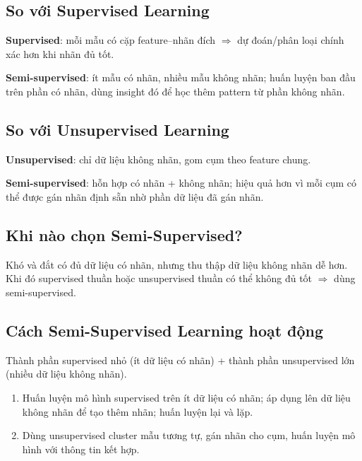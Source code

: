 \subsection{So với Supervised Learning}

\begin{ynghia}[title={Khác biệt chính: dataset}]
\textbf{Supervised}: mỗi mẫu có cặp feature--nhãn đích $\Rightarrow$ dự đoán/phân loại chính xác hơn khi nhãn đủ tốt.

\textbf{Semi-supervised}: ít mẫu có nhãn, nhiều mẫu không nhãn; huấn luyện ban đầu trên phần có nhãn, dùng insight đó để học thêm pattern từ phần không nhãn.
\end{ynghia}

\subsection{So với Unsupervised Learning}

\begin{ynghia}[title={Khác biệt}]
\textbf{Unsupervised}: chỉ dữ liệu không nhãn, gom cụm theo feature chung.

\textbf{Semi-supervised}: hỗn hợp có nhãn + không nhãn; hiệu quả hơn vì mỗi cụm có thể được gán nhãn định sẵn nhờ phần dữ liệu đã gán nhãn.
\end{ynghia}

\subsection{Khi nào chọn Semi-Supervised?}

\begin{luuy}[title={Tình huống điển hình}]
Khó và đắt có đủ dữ liệu có nhãn, nhưng thu thập dữ liệu không nhãn dễ hơn.
Khi đó supervised thuần hoặc unsupervised thuần có thể không đủ tốt $\Rightarrow$ dùng semi-supervised.
\end{luuy}

\subsection{Cách Semi-Supervised Learning hoạt động}

\begin{phuongphap}[title={Thành phần huấn luyện}]
Thành phần supervised nhỏ (ít dữ liệu có nhãn) + thành phần unsupervised lớn (nhiều dữ liệu không nhãn).
\end{phuongphap}

\begin{phuongphap}[title={Hai hướng triển khai}]
\begin{enumerate}
  \item Huấn luyện mô hình supervised trên ít dữ liệu có nhãn; áp dụng lên dữ liệu không nhãn để tạo thêm nhãn; huấn luyện lại và lặp.
  \item Dùng unsupervised cluster mẫu tương tự, gán nhãn cho cụm, huấn luyện mô hình với thông tin kết hợp.
\end{enumerate}
\end{phuongphap}

